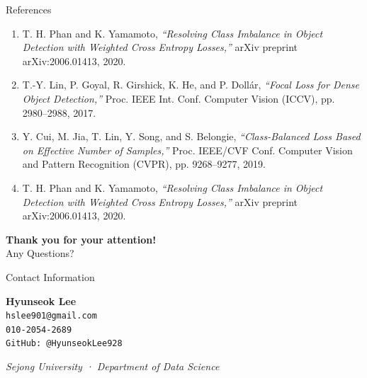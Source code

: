 \documentclass[aspectratio=169]{beamer}
\renewcommand{\textbf}[1]{\textcolor{SejongBlue}{\sf\bfseries #1}}
\begin{document}
\begin{frame}{References}
\small
\begin{enumerate}

\item T. H. Phan and K. Yamamoto,
\textit{“Resolving Class Imbalance in Object Detection with Weighted Cross Entropy Losses,”}
arXiv preprint arXiv:2006.01413, 2020.

\item T.-Y. Lin, P. Goyal, R. Girshick, K. He, and P. Dollár,
\textit{“Focal Loss for Dense Object Detection,”}
Proc. IEEE Int. Conf. Computer Vision (ICCV), pp. 2980–2988, 2017.

\item Y. Cui, M. Jia, T. Lin, Y. Song, and S. Belongie,
\textit{“Class-Balanced Loss Based on Effective Number of Samples,”}
Proc. IEEE/CVF Conf. Computer Vision and Pattern Recognition (CVPR),
pp. 9268–9277, 2019.

\item T. H. Phan and K. Yamamoto,
\textit{“Resolving Class Imbalance in Object Detection with Weighted Cross Entropy Losses,”}
arXiv preprint arXiv:2006.01413, 2020.

\end{enumerate}
\end{frame}


\begin{frame}[plain]
\centering

\vspace{1.5em}

{\Huge \textbf{Thank you for your attention!}}\\[1.2em]

{\Large Any Questions?}\\[2.2em]

\begin{mybox}[width=0.65\textwidth, center, left=10pt, right=10pt, top=10pt, bottom=10pt]{Contact Information} %

\centering
{\Large \textbf{Hyunseok Lee}} \\[0.5em]
{\large \texttt{hslee901@gmail.com}} \\[0.3em]
{\large \texttt{010-2054-2689}} \\[0.3em]
{\large \texttt{GitHub: @HyunseokLee928}}

\end{mybox}

\vspace{1.2em}
{\small \textit{Sejong University · Department of Data Science}}

\end{frame}
\end{document}
